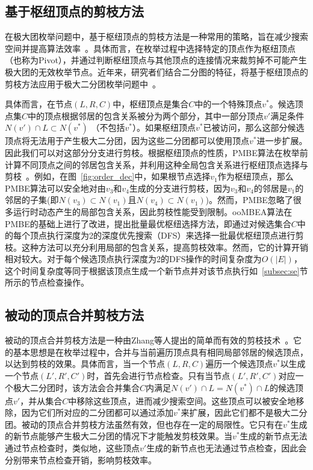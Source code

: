 \subsection{基于枢纽顶点的剪枝方法}
\label{subsec:pivot}

在极大团枚举问题中，基于枢纽顶点的剪枝方法是一种常用的策略，旨在减少搜索空间并提高算法效率~\cite{MCEdegeneracy10}。具体而言，在枚举过程中选择特定的顶点作为枢纽顶点（也称为Pivot），并通过判断枢纽顶点与其他顶点的连接情况来裁剪掉不可能产生极大团的无效枚举节点。近年来，研究者们结合二分图的特征，将基于枢纽顶点的剪枝方法应用于极大二分团枚举问题中~\cite{PMBE20,ooMBE22}。

具体而言，在节点$(L,R,C)$中，枢纽顶点是集合$C$中的一个特殊顶点$v^*$。候选顶点集$C$中的顶点根据邻居的包含关系被分为两个部分，其中一部分顶点$v'$满足条件$N(v') \cap L \subset N(v^*)$ （不包括$v^*$）。如果枢纽顶点$v^*$已被访问，那么这部分候选顶点将无法用于产生极大二分团，因为这些二分团都可以使用顶点$v^*$进一步扩展。因此我们可以对这部分分支进行剪枝。根据枢纽顶点的性质，PMBE算法在枚举前计算不同顶点之间的邻居包含关系，并利用这种全局包含关系进行枢纽顶点选择与剪枝~\cite{PMBE20}。例如，在图~\ref{fig:order_dec}中，如果根节点选择$v_1$作为枢纽顶点，那么PMBE算法可以安全地对由$v_3$和$v_4$生成的分支进行剪枝，因为$v_3$和$v_4$的邻居是$v_1$的邻居的子集(即$N(v_3)\subset N(v_1)$且$N(v_4)\subset N(v_1)$)。然而，PMBE忽略了很多运行时动态产生的局部包含关系，因此剪枝性能受到限制。ooMBEA算法在PMBE的基础上进行了改进，提出批量最优枢纽选择方法，即通过对候选集合$C$中的每个顶点执行深度为2的深度优先搜索（DFS）来选择一批最优枢纽顶点进行剪枝。这种方法可以充分利用局部的包含关系，提高剪枝效率。然而，它的计算开销相对较大。对于每个候选顶点执行深度为2的DFS操作的时间复杂度为$O(|E|)$，这个时间复杂度等同于根据该顶点生成一个新节点并对该节点执行如~\ref{subsec:se}节所示的节点检查操作。


\subsection{被动的顶点合并剪枝方法}
\label{subsec:pmp}

被动的顶点合并剪枝方法是一种由Zhang等人提出的简单而有效的剪枝技术~\cite{iMBEA14}。它的基本思想是在枚举过程中，合并与当前遍历顶点具有相同局部邻居的候选顶点，以达到剪枝的效果。具体而言，当一个节点$(L, R, C)$遍历一个候选顶点$v^*$以生成一个节点$(L', R', C')$时，首先会进行节点检查。只有当节点$(L', R', C')$对应一个极大二分团时，该方法会合并集合$C$内满足$N(v') \cap L = N(v^*) \cap L$的候选顶点$v'$，并从集合$C$中移除这些顶点，进而减少搜索空间。这些顶点可以被安全地移除，因为它们所对应的二分团都可以通过添加$v^*$来扩展，因此它们都不是极大二分团。被动的顶点合并剪枝方法虽然有效，但也存在一定的局限性。它只有在$v^*$生成的新节点能够产生极大二分团的情况下才能触发剪枝效果。当$v^*$生成的新节点无法通过节点检查时，类似地，这些顶点$v'$生成的新节点也无法通过节点检查，因此会分别带来节点检查开销，影响剪枝效率。

